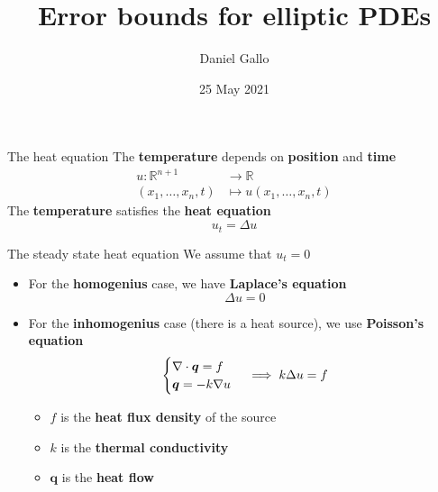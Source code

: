 \documentclass{beamer}
\title{Error bounds for elliptic PDEs}
\author{Daniel Gallo}
\institute{University of Bergen}
\date{25 May 2021}
\def\R{\mathbb{R}}
\begin{document}
    \begin{frame}
        \titlepage
    \end{frame}

    \begin{frame}{The heat equation}
        The \textbf{temperature} depends on \textbf{position} and \textbf{time}
        \begin{align*}
            u \colon \R^{n + 1} &\to \R \\
            (x_1, \dots, x_n, t) &\mapsto u(x_1, \dots, x_n, t)
        \end{align*}
        The \textbf{temperature} satisfies the \textbf{heat equation}
        \begin{equation*}
            u_t = \Delta u
        \end{equation*}
    \end{frame}

    \begin{frame}{The steady state heat equation}
        We assume that $u_t = 0$
        \begin{itemize}
            \item For the \textbf{homogenius} case, we have \textbf{Laplace's equation}
            \begin{equation*}
                \Delta u = 0
            \end{equation*}
            \item For the \textbf{inhomogenius} case (there is a heat source), we use \textbf{Poisson's equation}
            \begin{equation*}
                \begin{cases}
                    \nabla \cdot \bm{q} = f \\
                    \bm{q} = -k \nabla u
                \end{cases}
                \implies
                \-k \Delta u = f
            \end{equation*}
            \begin{itemize}
                \item $f$ is the \textbf{heat flux density} of the source
                \item $k$ is the \textbf{thermal conductivity}
                \item $\bm{q}$ is the \textbf{heat flow}
            \end{itemize}
        \end{itemize}
    \end{frame}
\end{document}

